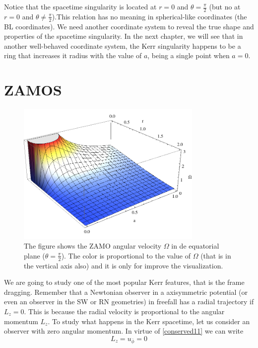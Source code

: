 Notice that the spacetime singularity is located at $r=0$ and $\theta=\frac{\pi}{2}$ (but no at $r=0$ and $\theta \neq \frac{\pi}{2}$).This relation has no meaning in spherical-like coordinates (the \gls{BL} coordinates). We need another coordinate system to reveal the true shape and properties of the spacetime singularity. In the next chapter, we will see that in another well-behaved coordinate system, the Kerr singularity happens to be a ring that increases it radius with the value of $a$, being a single point when $a=0$.

\section{ZAMOS}
  \begin{figure}[htp!]  
\begin{center}
 \centerline{\includegraphics[width=0.8\textwidth]{img/Chapter0/ZAMO.png}}
 \end{center}
 \caption{The figure shows the ZAMO angular velocity $\Omega$ in de equatorial plane ($\theta=\frac{\pi}{2}$). The color is proportional to the value of $\Omega$ (that is in the vertical axis also) and it is only for improve the visualization.}
 \label{fig:ZAMO}
\end{figure} 
We are going to study one of the most popular Kerr features, that is the frame dragging. Remember that a Newtonian observer in a axisymmetric potential (or even an observer in the \gls{SW} or \gls{RN} geometries) in freefall has a radial trajectory if $L_z=0$. This is because the radial velocity is proportional to the angular momentum $L_z$. To study what happens in the Kerr spacetime, let us consider an observer with zero angular momentum. In virtue of \cref{conserved11} we can write
\begin{equation}\label{zamoeq1}
 L_z=u_{\bar{\phi}}=0
\end{equation}
